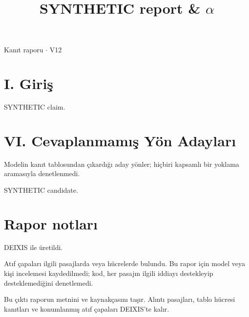 \documentclass[journal]{IEEEtran}
\begin{document}
\renewcommand{\abstractname}{Özet}
\renewcommand{\IEEEkeywordsname}{Dizin Terimleri}
\renewcommand{\refname}{Kaynaklar}

\title{SYNTHETIC report \& \ensuremath{\alpha}}

\maketitle

\noindent Kanıt raporu \ensuremath{\cdot} V12

\section*{I. Giriş}

SYNTHETIC claim. \cite{Synth26}

\section*{VI. Cevaplanmamış Yön Adayları}

Modelin kanıt tablosundan çıkardığı aday yönler; hiçbiri kapsamlı bir yoklama aramasıyla denetlenmedi.

SYNTHETIC candidate.

\section*{Rapor notları}

DEIXIS ile üretildi.

Atıf çapaları ilgili pasajlarda veya hücrelerde bulundu. Bu rapor için model veya kişi incelemesi kaydedilmedi; kod, her pasajın ilgili iddiayı destekleyip desteklemediğini denetlemedi.

Bu çıktı raporun metnini ve kaynakçasını taşır. Alıntı pasajları, tablo hücresi kanıtları ve konumlanmış atıf çapaları DEIXIS'te kalır.




\end{document}
